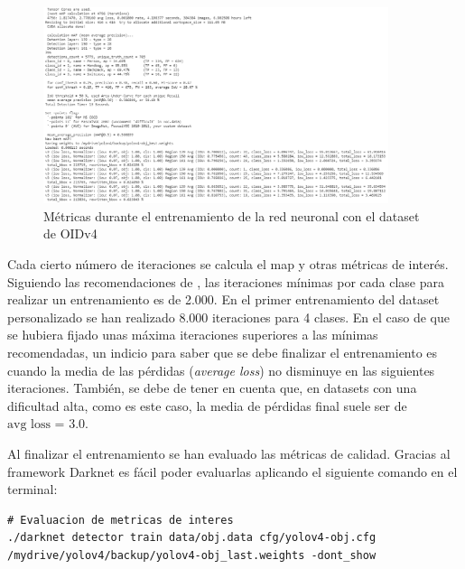 \begin{figure}[ht]
\centering
\includegraphics[width=0.9\textwidth]{img/chapters/resultados/metricas/metrics-during-training.png}
\caption{\label{fig:metrics-during-train}Métricas durante el entrenamiento de la red neuronal con el dataset de OIDv4}
\end{figure}

Cada cierto número de iteraciones se calcula el \gls{map} y otras métricas de interés. Siguiendo las recomendaciones de \cite{yolov4-darknet-github}, las iteraciones mínimas por cada clase para realizar un entrenamiento es de 2.000. En el primer entrenamiento del dataset personalizado se han realizado 8.000 iteraciones para 4 clases. En el caso de que se hubiera fijado unas máxima iteraciones superiores a las mínimas recomendadas, un indicio para saber que se debe finalizar el entrenamiento es cuando la media de las pérdidas (\textit{average loss}) no disminuye en las siguientes iteraciones. También, se debe de tener en cuenta que, en datasets con una dificultad alta, como es este caso, la media de pérdidas final suele ser de $\text{avg loss = 3.0}$.

Al finalizar el entrenamiento se han evaluado las métricas de calidad. Gracias al framework Darknet \cite{darknet13} es fácil poder evaluarlas aplicando el siguiente comando en el terminal:

\vspace{0.5cm}
\begin{lstlisting}[language=iPython,caption=Evaluación métricas de calidad del dataset utilizado para el entrenamiento de la red neuronal de detección de objetos,captionpos=b,label={lst:darknet-map}]
# Evaluacion de metricas de interes
./darknet detector train data/obj.data cfg/yolov4-obj.cfg /mydrive/yolov4/backup/yolov4-obj_last.weights -dont_show
\end{lstlisting}

